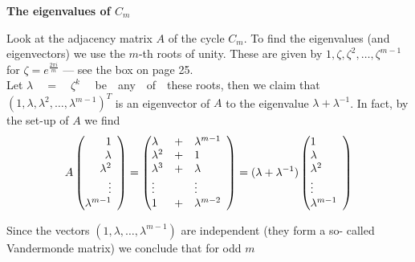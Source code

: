 \documentclass[openany,12pt]{memoir}
\begin{document}
\begin{mdframed}[nobreak=true]
\vspace{8pt}
{\Large\textbf{The eigenvalues of $C_m$}}
\vspace{5pt}

Look at the adjacency matrix $A$ of the cycle $C_m$. To find the eigenvalues 
(and eigenvectors) we use the $m$-th roots of unity. These are 
given by $1, \zeta, \zeta^2, \ldots, \zeta^{m-1}$ for $\zeta = e^{\frac{2\pi i}{m}}$ --- see the box on page 25.\\ 
Let $\lambda \quad=\quad\zeta ^k$ \ \ be\ \  any\ \  of\ \  these roots, then we claim that
$(1, \lambda, \lambda^2, \ldots, \lambda^{m-1})^T$ is an eigenvector of $A$ to the eigenvalue $\lambda + \lambda^{-1}$.
In fact, by the set-up of $A$ we find\\

\[
A \begin{pmatrix}
    \begin{array}{@{}*{5}{r}@{}}
    1 \\
    \lambda \\
    \lambda^2 \\
    \vdots \\
    \lambda^{m-1}
    \end{array}
\end{pmatrix}
=
\begin{pmatrix}
    \begin{array}{@{}*{5}{l}@{}}
    \lambda & + & \lambda^{m-1} \\
    \lambda^2 & + & 1 \\
    \lambda^3 & + & \lambda \\
    \vdots & & \vdots \\
    1 & + & \lambda^{m-2}
    \end{array}
\end{pmatrix}
=
(\lambda + \lambda^{-1})
\begin{pmatrix}
    \begin{array}{@{}*{5}{l}@{}}
    1 \\
    \lambda \\
    \lambda^2 \\
    \vdots \\
    \lambda^{m-1}
    \end{array}
\end{pmatrix}
\]

Since the vectors $(1, \lambda, \ldots, \lambda^{m-1})$ are independent (they form a so-
called Vandermonde matrix) we conclude that for odd $m$


\end{mdframed}
\end{document}
